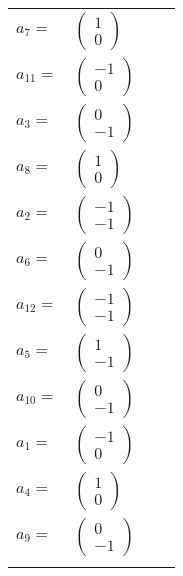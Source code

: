 \documentclass[1p]{elsarticle_modified}
\theoremstyle{definition}
\begin{document}
\begin{tabular}{m{7pt} m{180pt} m{7pt} m{180pt} }
\flushright $a_{7}=$&$\begin{pmatrix}1\\0\end{pmatrix}$ \\
\flushright $a_{11}=$&$\begin{pmatrix}-1\\0\end{pmatrix}$ \\
\flushright $a_{3}=$&$\begin{pmatrix}0\\-1\end{pmatrix}$ \\
\flushright $a_{8}=$&$\begin{pmatrix}1\\0\end{pmatrix}$ \\
\flushright $a_{2}=$&$\begin{pmatrix}-1\\-1\end{pmatrix}$ \\
\flushright $a_{6}=$&$\begin{pmatrix}0\\-1\end{pmatrix}$ \\
\flushright $a_{12}=$&$\begin{pmatrix}-1\\-1\end{pmatrix}$ \\
\flushright $a_{5}=$&$\begin{pmatrix}1\\-1\end{pmatrix}$ \\
\flushright $a_{10}=$&$\begin{pmatrix}0\\-1\end{pmatrix}$ \\
\flushright $a_{1}=$&$\begin{pmatrix}-1\\0\end{pmatrix}$ \\
\flushright $a_{4}=$&$\begin{pmatrix}1\\0\end{pmatrix}$ \\
\flushright $a_{9}=$&$\begin{pmatrix}0\\-1\end{pmatrix}$\\&\end{tabular}
\end{document}
